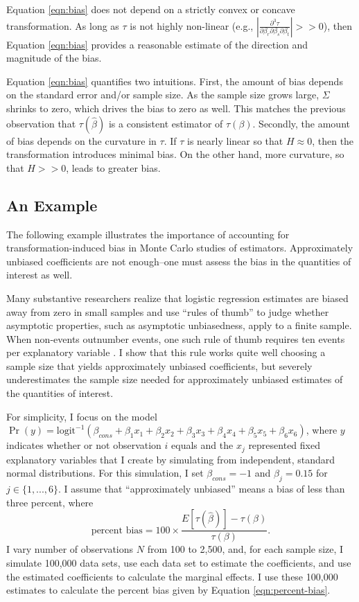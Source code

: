 \documentclass[12pt]{article}
\begin{document}
Equation \ref{eqn:bias} does not depend on a strictly convex or concave transformation. 
As long as $\tau$ is not highly non-linear (e.g., $\left|\frac{\partial^3 \tau}{\partial \beta_r \partial \beta_s \partial \beta_t}\right| >> 0$), then Equation \ref{eqn:bias} provides a reasonable estimate of the direction and magnitude of the bias.

Equation \ref{eqn:bias} quantifies two intuitions. 
First, the amount of bias depends on the standard error and/or sample size. 
As the sample size grows large, $\Sigma$ shrinks to zero, which drives the bias to zero as well. 
This matches the previous observation that $\tau(\hat{\beta})$ is a consistent estimator of $\tau(\beta)$. 
Secondly, the amount of bias depends on the curvature in $\tau$. 
If $\tau$ is nearly linear so that $H \approx 0$, then the transformation introduces minimal bias. 
On the other hand, more curvature, so that $H >> 0$, leads to greater bias. 

\subsection*{An Example}

The following example illustrates the importance of accounting for transformation-induced bias in Monte Carlo studies of estimators. 
Approximately unbiased coefficients are not enough--one must assess the bias in the quantities of interest as well. 

Many substantive researchers realize that logistic regression estimates are biased away from zero in small samples and use ``rules of thumb'' to judge whether asymptotic properties, such as asymptotic unbiasedness, apply to a finite sample.
When non-events outnumber events, one such rule of thumb requires ten events per explanatory variable \citep{Peduzzietal1996}.
I show that this rule works quite well choosing a sample size that yields approximately unbiased coefficients, but severely underestimates the sample size needed for approximately unbiased estimates of the quantities of interest.

For simplicity, I focus on the model $\Pr (y) = \text{logit}^{-1}(\beta_{cons} + \beta_1x_1 + \beta_2x_2 + \beta_3x_3 + \beta_4x_4 + \beta_5x_5 + \beta_6x_6)$, where $y$ indicates whether or not observation $i$ equals and the $x_j$ represented fixed explanatory variables that I create by simulating from independent, standard normal distributions. 
For this simulation, I set $\beta_{cons} = -1$ and $\beta_j =  0.15$ for $j \in \{1, ..., 6\}$. 
I assume that ``approximately unbiased'' means a bias of less than three percent, where
\begin{equation}\label{eqn:percent-bias}
\text{percent bias} = 100 \times \frac{E[\tau(\hat{\beta})] - \tau(\beta)}{\tau(\beta)}\text{.}
\end{equation}
I vary number of observations $N$ from 100 to 2,500, and, for each sample size, I simulate 100,000 data sets, use each data set to estimate the coefficients, and use the estimated coefficients to calculate the marginal effects.
I use these 100,000 estimates to calculate the percent bias given by Equation \ref{eqn:percent-bias}.
\end{document}
